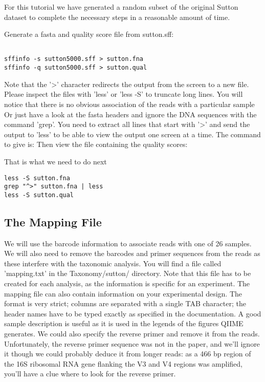 \begin{information}
For this tutorial we have generated a random subset of the original Sutton dataset to complete the necessary steps in a reasonable amount of time.
\end{information}

\begin{steps}

Generate a fasta and quality score file from sutton.sff:
\begin{lstlisting}

sffinfo -s sutton5000.sff > sutton.fna
sffinfo -q sutton5000.sff > sutton.qual

\end{lstlisting}

Note that the '>' character redirects the output from the screen to a new file. Please inspect the files with 'less' or 'less -S' to truncate long lines. You will notice that there is no obvious association of the reads with a particular sample
Or just have a look at the fasta headers and ignore the DNA sequences with the command 'grep'. You need to extract all lines that start with '>' and send the output to 'less' to be able to view the output one screen at a time. The command to give is:
Then view the file containing the quality scores:

That is what we need to do next

\begin{lstlisting}
less -S sutton.fna
grep "^>" sutton.fna | less
less -S sutton.qual

\end{lstlisting}
\end{steps}

\subsection{The Mapping File}

\begin{information}
We will use the barcode information to associate reads with one of 26 samples. We will also need to remove the barcodes and primer sequences from the reads as these interfere with the taxonomic analysis. 
You will find a file called 'mapping.txt' in the Taxonomy/sutton/ directory. 
Note that this file has to be created for each analysis, as the information is specific for an experiment. The mapping file can also contain information on your experimental design. The format is very strict; columns are separated with a single TAB character; the header names have to be typed exactly as specified in the documentation. A good sample description is useful as it is used in the legends of the figures QIIME generates. We could also specify the reverse primer and remove it from the reads. Unfortunately, the reverse primer sequence was not in the paper, and we'll ignore it though we could probably deduce it from longer reads: as a 466 bp region of the 16S ribosomal RNA gene flanking the V3 and V4 regions was amplified, you'll have a clue where to look for the reverse primer.

\end{information}

